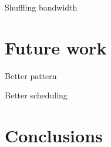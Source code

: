 \documentclass{acm_proc_article-sp}
\begin{document}
Shuffling bandwidth


\section{Future work}
\label{sec:future-work}
Better pattern

Better scheduling


\section{Conclusions}
\label{sec:conclusions}






  
\end{document}
